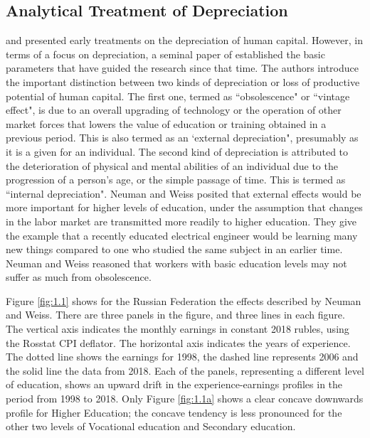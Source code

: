 \documentclass[alpha-refs]{wiley-article-02b}
\begin{document}
\subsection{Analytical Treatment of Depreciation} 

\citet{Rosen_1976}  and \citet{Mincer_1982} presented early treatments on the depreciation of human capital. However, in terms of a focus on depreciation, a seminal paper of \citet{Neuman_1995} established the basic parameters that have guided the research since that time. The authors introduce the important distinction between two kinds of depreciation or loss of productive potential of human capital. The first one, termed as ``obsolescence" or ``vintage effect", is due to an overall upgrading of technology or the operation of other market forces that lowers the value of education or training obtained in a previous period. This is also termed as an `external depreciation", presumably as it is a given for an individual. The second kind of depreciation is attributed to the deterioration of physical and mental abilities of an individual due to the progression of a person's age, or the simple passage of time. This is termed as ``internal depreciation". Neuman and Weiss posited that external effects would be more important for higher levels of education, under the assumption that changes in the labor market are transmitted more readily to higher education. They give the example that a recently educated electrical engineer would be learning many new things compared to one who studied the same subject in an earlier time. Neuman and Weiss reasoned that workers with basic education levels may not suffer as much from obsolescence. 

Figure \ref{fig:1.1} shows for the Russian Federation the effects described by Neuman and Weiss. There are three panels in the figure, and three lines in each figure. The vertical axis indicates the monthly earnings in constant 2018 rubles, using the Rosstat CPI deflator. The horizontal axis indicates the years of experience. The dotted line shows the earnings for 1998, the dashed line represents 2006 and the solid line the data from 2018. Each of the panels, representing a different level of education, shows an upward drift in the experience-earnings profiles in the period from 1998 to 2018. Only Figure \ref{fig:1.1a} shows a clear concave downwards profile for Higher Education; the concave tendency is less pronounced for the other two levels of Vocational education and Secondary education.
	
\end{document}
